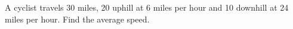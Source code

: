A cyclist travels 30 miles, 20 uphill at 6 miles per hour and 10 downhill at 24 miles per hour. Find the average speed.
